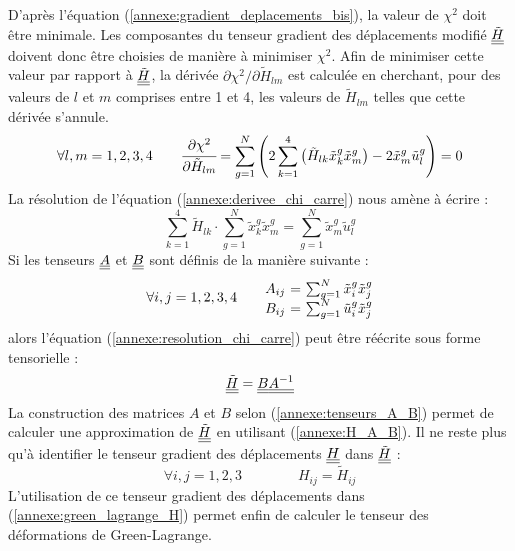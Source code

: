 D'après l'équation (\ref{annexe:gradient_deplacements_bis}), la valeur de $\chi^2$ doit être minimale. Les composantes du tenseur gradient des déplacements modifié $\underline{\underline{\tilde{H}}}$ doivent donc être choisies de manière à minimiser $\chi^2$. Afin de minimiser cette valeur par rapport à $\underline{\underline{\tilde{H}}}$, la dérivée $\partial\chi^2/\partial \tilde{H}_{lm}$ est calculée en cherchant, pour des valeurs de $l$ et $m$ comprises entre \num{1} et \num{4}, les valeurs de $\tilde{H}_{lm}$ telles que cette dérivée s'annule.
\begin{equation}\label{annexe:derivee_chi_carre}
\forall l,m =1,2,3,4\qquad
\cfrac{\partial \chi^2}{\partial \tilde{H}_{lm}}
= \sum_{g=1}^{N} \left( 2\sum_{k=1}^{4} \left( \tilde{H}_{lk}\tilde{x}_k^g \tilde{x}_m^g \right) - 2\tilde{x}_m^g\tilde{u}_l^g \right)
= 0
\end{equation}
La résolution de l'équation (\ref{annexe:derivee_chi_carre}) nous amène à écrire :
\begin{equation}\label{annexe:resolution_chi_carre}
\sum_{k=1}^{4} \tilde{H}_{lk} \cdot \sum_{g=1}^{N} \tilde{x}_k^g\tilde{x}_m^g 
= \sum_{g=1}^{N} \tilde{x}_m^g\tilde{u}_l^g
\end{equation}
Si les tenseurs $\underline{\underline{A}}$ et $\underline{\underline{B}}$ sont définis de la manière suivante :
\begin{equation}\label{annexe:tenseurs_A_B}
\begin{array}{l@{\qquad}r@{\ =\ }l}
\multirow{2}{*}{$\forall i,j = 1,2,3,4$} & A_{ij} & \sum_{g=1}^{N} \tilde{x}_i^g\tilde{x}_j^g \\
& B_{ij} & \sum_{g=1}^{N} \tilde{u}_i^g\tilde{x}_j^g
\end{array}
\end{equation}
alors l'équation (\ref{annexe:resolution_chi_carre}) peut être réécrite sous forme tensorielle :
\begin{equation}\label{annexe:H_A_B}
\underline{\underline{\tilde{H}}} = \underline{\underline{B}}\underline{\underline{A^{-1}}}
\end{equation}
La construction des matrices $A$ et $B$ selon (\ref{annexe:tenseurs_A_B}) permet de calculer une approximation de $\underline{\underline{\tilde{H}}}$ en utilisant (\ref{annexe:H_A_B}). Il ne reste plus qu'à identifier le tenseur gradient des déplacements $\underline{\underline{H}}$ dans $\underline{\underline{\tilde{H}}}$ :
$$
\forall i,j=1,2,3
\qquad\qquad
H_{ij} = \tilde{H}_{ij}
$$
L'utilisation de ce tenseur gradient des déplacements dans (\ref{annexe:green_lagrange_H}) permet enfin de calculer le tenseur des déformations de Green-Lagrange.